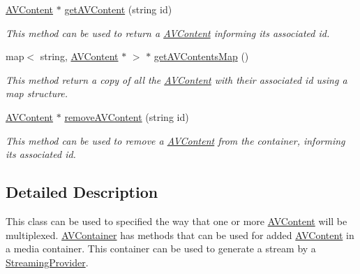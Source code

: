 \begin{DoxyCompactItemize}
\hyperlink{classbr_1_1ufscar_1_1lince_1_1xpta_1_1streaming_1_1AVContent}{AVContent} $\ast$ \hyperlink{classbr_1_1ufscar_1_1lince_1_1xpta_1_1streaming_1_1AVContainer_ab51eec9b187ee82743e8b63c4db28a1b}{getAVContent} (string id)
\begin{DoxyCompactList}\small\item\em This method can be used to return a \hyperlink{classbr_1_1ufscar_1_1lince_1_1xpta_1_1streaming_1_1AVContent}{AVContent} informing its associated id. \item\end{DoxyCompactList}\item 
map$<$ string, \hyperlink{classbr_1_1ufscar_1_1lince_1_1xpta_1_1streaming_1_1AVContent}{AVContent} $\ast$ $>$ $\ast$ \hyperlink{classbr_1_1ufscar_1_1lince_1_1xpta_1_1streaming_1_1AVContainer_a7979a7cb5edc974b9036eb868aeca5a6}{getAVContentsMap} ()
\begin{DoxyCompactList}\small\item\em This method return a copy of all the \hyperlink{classbr_1_1ufscar_1_1lince_1_1xpta_1_1streaming_1_1AVContent}{AVContent} with their associated id using a map structure. \item\end{DoxyCompactList}\item 
\hyperlink{classbr_1_1ufscar_1_1lince_1_1xpta_1_1streaming_1_1AVContent}{AVContent} $\ast$ \hyperlink{classbr_1_1ufscar_1_1lince_1_1xpta_1_1streaming_1_1AVContainer_a7858bba2c48c8feb2b8cfdaaa0961354}{removeAVContent} (string id)
\begin{DoxyCompactList}\small\item\em This method can be used to remove a \hyperlink{classbr_1_1ufscar_1_1lince_1_1xpta_1_1streaming_1_1AVContent}{AVContent} from the container, informing its associated id. \item\end{DoxyCompactList}\end{DoxyCompactItemize}


\subsection{Detailed Description}
This class can be used to specified the way that one or more \hyperlink{classbr_1_1ufscar_1_1lince_1_1xpta_1_1streaming_1_1AVContent}{AVContent} will be multiplexed. \hyperlink{classbr_1_1ufscar_1_1lince_1_1xpta_1_1streaming_1_1AVContainer}{AVContainer} has methods that can be used for added \hyperlink{classbr_1_1ufscar_1_1lince_1_1xpta_1_1streaming_1_1AVContent}{AVContent} in a media container. This container can be used to generate a stream by a \hyperlink{classbr_1_1ufscar_1_1lince_1_1xpta_1_1streaming_1_1StreamingProvider}{StreamingProvider}. 

